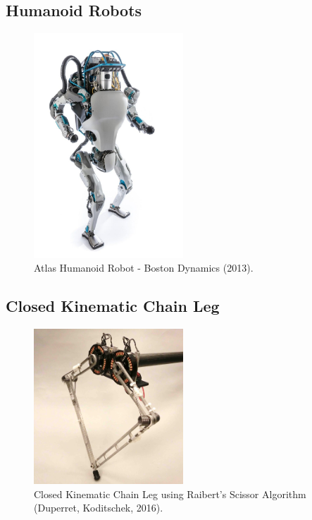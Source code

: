 \subsection{Humanoid Robots}

\begin{figure}[H]
\centering
\includegraphics[width=0.5\textwidth]{images/literature/atlas-humanoid.jpg} 
\caption{Atlas Humanoid Robot - Boston Dynamics (2013).}
\label{fig:legV1}
\end{figure}

\subsection{Closed Kinematic Chain Leg}

\begin{figure}[H]
\centering
\includegraphics[width=0.5\textwidth]{images/literature/pen-state-scissor.jpg} 
\caption{Closed Kinematic Chain Leg using Raibert's Scissor Algorithm (Duperret, Koditschek, 2016).}
\label{fig:pen-state-scissor}
\end{figure}

